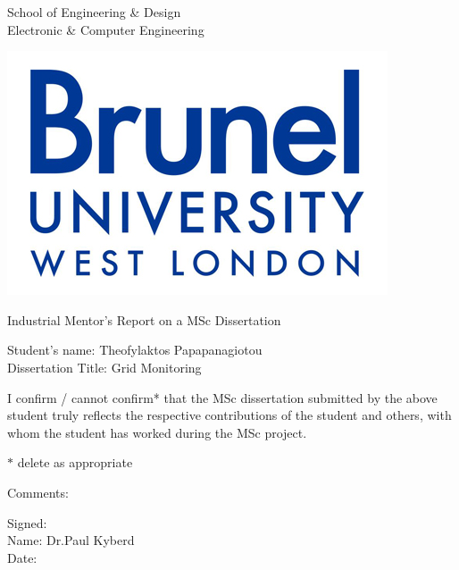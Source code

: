 \newpage
\thispagestyle{empty}
\begin{center}
\Large
School of Engineering \& Design\\
Electronic \& Computer Engineering\\
\vspace{0.5\baselineskip}
\begin{center}
\includegraphics{images/brunellogo.jpg}\\
\end{center}
\Large
Industrial Mentor's Report on a MSc Dissertation\\
\end{center}
\Large
\vspace{0.5\baselineskip}
Student's name: Theofylaktos Papapanagiotou
\\
Dissertation Title: Grid Monitoring

\vspace{0.5\baselineskip}
\large
\noindent

I confirm / cannot confirm* that the MSc dissertation submitted by the above student
truly reflects the respective contributions of the student and others, with whom the
student has worked during the MSc project.

\vspace{0.5\baselineskip}
$*$ delete as appropriate

\vspace{1\baselineskip}
Comments:


\vspace{2.5\baselineskip}
\noindent
Signed:\\
Name: Dr.Paul Kyberd\\
Date: